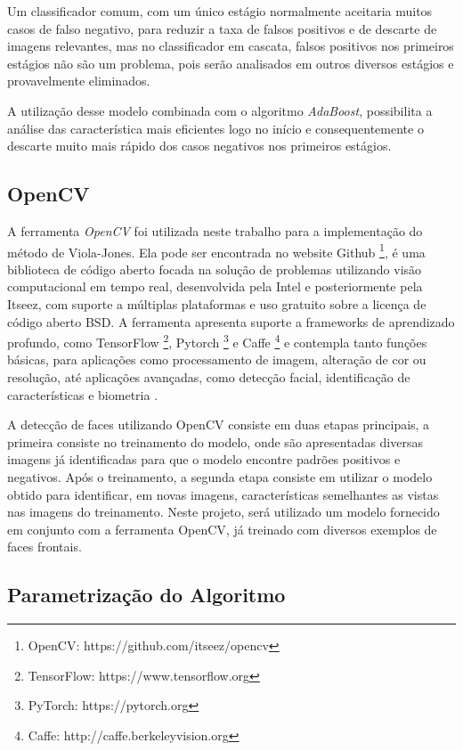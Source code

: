 Um classificador comum, com um único estágio normalmente aceitaria muitos casos de falso negativo, para reduzir a taxa de falsos positivos e de descarte de imagens relevantes, mas no classificador em cascata, falsos positivos nos primeiros estágios não são um problema, pois serão analisados em outros diversos estágios e provavelmente eliminados.

A utilização desse modelo combinada com o algoritmo \textit{AdaBoost}, possibilita a análise das característica mais eficientes logo no início e consequentemente o descarte muito mais rápido dos casos negativos nos primeiros estágios.

\subsection{OpenCV}

A ferramenta \textit{OpenCV} foi utilizada neste trabalho para a implementação do método de Viola-Jones. Ela pode ser encontrada no website Github \footnote{OpenCV: https://github.com/itseez/opencv}, é uma biblioteca de código aberto focada na solução de problemas utilizando visão computacional em tempo real, desenvolvida pela Intel e posteriormente pela Itseez, com suporte a múltiplas plataformas e uso gratuito sobre a licença de código aberto BSD. A ferramenta apresenta suporte a frameworks de aprendizado profundo, como TensorFlow \footnote{TensorFlow: https://www.tensorflow.org}, Pytorch \footnote{PyTorch: https://pytorch.org} e Caffe \footnote{Caffe: http://caffe.berkeleyvision.org} e contempla tanto funções básicas, para aplicações como processamento de imagem, alteração de cor ou resolução, até aplicações avançadas, como detecção facial, identificação de características e biometria \cite{wiki:OpenCV}.

A detecção de faces utilizando OpenCV consiste em duas etapas principais, a primeira consiste no treinamento do modelo, onde são apresentadas diversas imagens já identificadas para que o modelo encontre padrões positivos e negativos. Após o treinamento, a segunda etapa consiste em utilizar o modelo obtido para identificar, em novas imagens, características semelhantes as vistas nas imagens do treinamento. Neste projeto, será utilizado um modelo fornecido em conjunto com a ferramenta OpenCV, já treinado com diversos exemplos de faces frontais.

\subsection{Parametrização do Algoritmo}

